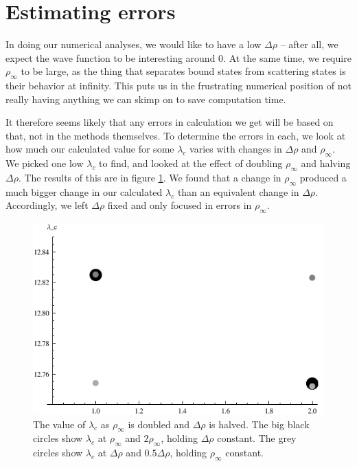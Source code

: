 \documentclass[12pt,twoside]{reedthesis}
\begin{document}
\section{Estimating errors}
In doing our numerical analyses, we would like to have a low $\Delta \rho$ -- after all, we expect the wave function to be interesting around 0. At the same time, we require $\rho_{\infty}$ to be large, as the thing that separates bound states from scattering states is their behavior at infinity. This puts us in the frustrating numerical position of not really having anything we can skimp on to save computation time.

It therefore seems likely that any errors in calculation we get will be based on that, not in the methods themselves. To determine the errors in each, we look at how much our calculated value for some $\lambda_{c}$ varies with changes in $\Delta \rho$ and $\rho_{\infty}$. We picked one low $\lambda_c$ to find, and looked at the effect of doubling $\rho_{\infty}$ and halving $\Delta \rho$. The results of this are in figure \ref{fig:errorchanges}. We found that a change in $\rho_{\infty}$ produced a much bigger change in our calculated $\lambda_c$ than an equivalent change in $\Delta \rho$. Accordingly, we left $\Delta \rho$ fixed and only focused in errors in $\rho_{\infty}$.

\begin{figure}[h]
\centering
\includegraphics{Figures/errors}
\caption[Errors in $\rho_{\infty}$ and $\Delta \rho$]{The value of $\lambda_c$ as $\rho_{\infty}$ is doubled and $\Delta \rho$ is halved. The big black circles show $\lambda_c$ at $\rho_{\infty}$ and $2\rho_{\infty}$, holding $\Delta \rho$ constant. The grey circles show $\lambda_c$ at $\Delta \rho$ and $0.5 \Delta \rho$, holding $\rho_{\infty}$ constant.}
\label{fig:errorchanges}
\end{figure}
\end{document}
